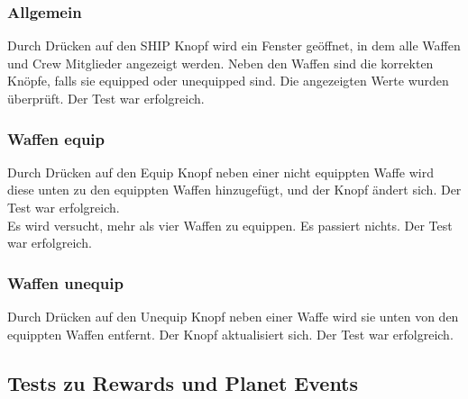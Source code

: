 \documentclass[fontsize=12pt,paper=a4,twoside]{scrartcl}
\begin{document}
\subsubsection{Allgemein}
Durch Drücken auf den SHIP Knopf wird ein Fenster geöffnet, in dem alle Waffen und Crew Mitglieder angezeigt werden. Neben den Waffen sind die korrekten Knöpfe, falls sie equipped oder unequipped sind. Die angezeigten Werte wurden überprüft. Der Test war erfolgreich. \\
\subsubsection{Waffen equip}
Durch Drücken auf den Equip Knopf neben einer nicht equippten Waffe wird diese unten zu den equippten Waffen hinzugefügt, und der Knopf ändert sich. Der Test war erfolgreich. \\
Es wird versucht, mehr als vier Waffen zu equippen. Es passiert nichts. Der Test war erfolgreich. \\
\subsubsection{Waffen unequip}
Durch Drücken auf den Unequip Knopf neben einer Waffe wird sie unten von den equippten Waffen entfernt. Der Knopf aktualisiert sich. Der Test war erfolgreich. \\



\subsection{Tests zu Rewards und Planet Events}
\end{document}
